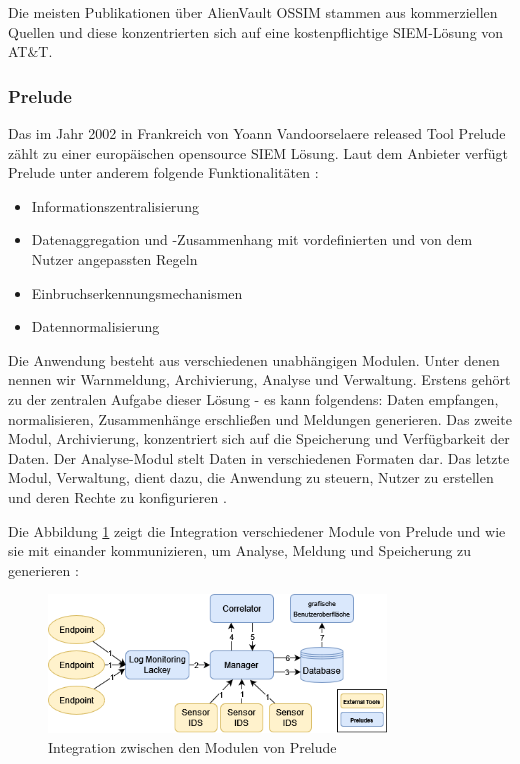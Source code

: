 
Die meisten Publikationen über AlienVault OSSIM stammen aus kommerziellen Quellen und diese konzentrierten sich auf eine kostenpflichtige \gls{SIEM}-Lösung von AT\&T.

\subsubsection{Prelude}
Das im Jahr 2002 in Frankreich von Yoann Vandoorselaere released Tool Prelude zählt zu einer europäischen \gls{opensource} \gls{SIEM} Lösung. Laut dem Anbieter verfügt Prelude unter anderem folgende Funktionalitäten \citep{Prelude_SIEM}:

\begin{itemize}[noitemsep]
   \item	Informationszentralisierung
   \item	Datenaggregation und -Zusammenhang mit vordefinierten und von dem Nutzer angepassten Regeln
   \item	Einbruchserkennungsmechanismen
   \item	Datennormalisierung
\end{itemize}

Die Anwendung besteht aus verschiedenen unabhängigen Modulen. Unter denen nennen wir Warnmeldung, Archivierung, Analyse und Verwaltung. Erstens gehört zu der zentralen Aufgabe dieser Lösung - es kann folgendens: Daten empfangen, normalisieren, Zusammenhänge erschließen und Meldungen generieren. Das zweite Modul, Archivierung, konzentriert sich auf die Speicherung und Verfügbarkeit der Daten. Der Analyse-Modul stelt Daten in verschiedenen Formaten dar. Das letzte Modul, Verwaltung, dient dazu, die Anwendung zu steuern, Nutzer zu erstellen und deren Rechte zu konfigurieren \citep{EC_Prelude}.

Die Abbildung \ref{fig:Module_preludes} zeigt die Integration verschiedener Module von Prelude und wie sie mit einander kommunizieren, um Analyse, Meldung und Speicherung zu generieren \citep{Prelude_MU}:

\begin{figure}[H]
   \centering
   \includegraphics[width=0.8\textwidth]{assets/Prelude_module.drawio.png}
   \caption[Integration zwischen den Modulen von Prelude ]
   {Integration zwischen den Modulen von Prelude }
   \label{fig:Module_preludes}
   \centering
\end{figure}

